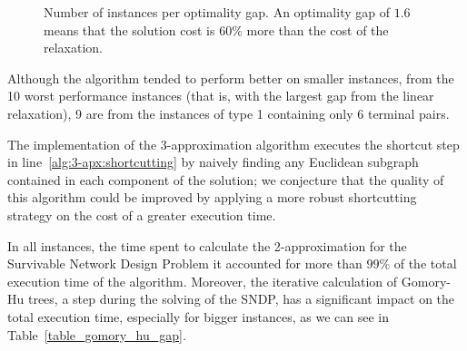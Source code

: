 
\begin{figure}[t!]
\centering
{}
\caption{Number of instances per optimality gap. An optimality gap of \(1.6\) means that the solution cost is \(60\%\) more than the cost of the relaxation.}
\label{fig:hist_opt_gap}
\end{figure}

Although the algorithm tended to perform better on smaller instances, from the 10 worst performance instances (that is, with the largest gap from the linear relaxation), 9 are from the instances of type 1 containing only 6 terminal pairs.

The implementation of the 3-approximation algorithm executes the shortcut step in line~\eqref{alg:3-apx:shortcutting} by naively finding any Euclidean subgraph contained in each component of the solution; we conjecture that the quality of this algorithm could be improved by applying a more robust shortcutting strategy on the cost of a greater execution time.

In all instances, the time spent to calculate the 2-approximation for the Survivable Network Design Problem it accounted for more than \(99\%\) of the total execution time of the algorithm. Moreover, the iterative calculation of Gomory-Hu trees, a step during the solving of the SNDP, has a significant impact on the total execution time, especially for bigger instances, as we can see in Table~\ref{table_gomory_hu_gap}.

